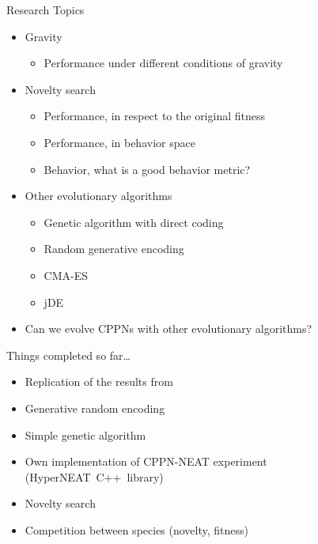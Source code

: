 \documentclass{beamer}
\begin{document}
\begin{frame}{Research Topics}
\begin{itemize}
\item Gravity
\begin{itemize}
\item Performance under different conditions of gravity
\end{itemize}
\item Novelty search
\begin{itemize}
\item Performance, in respect to the original fitness
\item Performance, in behavior space
\item Behavior, what is a good behavior metric?
\end{itemize}
\item Other evolutionary algorithms
\begin{itemize}
\item Genetic algorithm with direct coding
\item Random generative encoding
\item CMA-ES
\item jDE
\end{itemize}
\item Can we evolve CPPNs with other evolutionary algorithms?
\end{itemize}
\end{frame}

\begin{frame}{Things completed so far\ldots}
\begin{itemize}
\item Replication of the results from~\cite{cheney2013unshackling}
\item Generative random encoding
\item Simple genetic algorithm
\item Own implementation of CPPN-NEAT experiment (HyperNEAT~C++~library)
\item Novelty search
\item Competition between species (novelty, fitness)
\end{itemize}
\end{frame}
\end{document}
